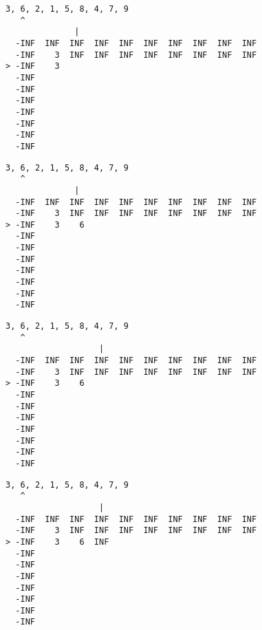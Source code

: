 { \begin{verbatim}
3, 6, 2, 1, 5, 8, 4, 7, 9
   ^
              |
  -INF  INF  INF  INF  INF  INF  INF  INF  INF  INF
  -INF    3  INF  INF  INF  INF  INF  INF  INF  INF
> -INF    3                                        
  -INF                                             
  -INF                                             
  -INF                                             
  -INF                                             
  -INF                                             
  -INF                                             
  -INF                                             
\end{verbatim} }

{ \begin{verbatim}
3, 6, 2, 1, 5, 8, 4, 7, 9
   ^
              |
  -INF  INF  INF  INF  INF  INF  INF  INF  INF  INF
  -INF    3  INF  INF  INF  INF  INF  INF  INF  INF
> -INF    3    6                                   
  -INF                                             
  -INF                                             
  -INF                                             
  -INF                                             
  -INF                                             
  -INF                                             
  -INF                                             
\end{verbatim} }

{ \begin{verbatim}
3, 6, 2, 1, 5, 8, 4, 7, 9
   ^
                   |
  -INF  INF  INF  INF  INF  INF  INF  INF  INF  INF
  -INF    3  INF  INF  INF  INF  INF  INF  INF  INF
> -INF    3    6                                   
  -INF                                             
  -INF                                             
  -INF                                             
  -INF                                             
  -INF                                             
  -INF                                             
  -INF                                             
\end{verbatim} }

{ \begin{verbatim}
3, 6, 2, 1, 5, 8, 4, 7, 9
   ^
                   |
  -INF  INF  INF  INF  INF  INF  INF  INF  INF  INF
  -INF    3  INF  INF  INF  INF  INF  INF  INF  INF
> -INF    3    6  INF                              
  -INF                                             
  -INF                                             
  -INF                                             
  -INF                                             
  -INF                                             
  -INF                                             
  -INF                                             
\end{verbatim} }

